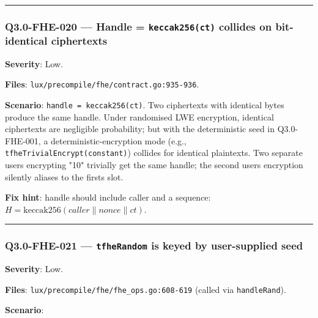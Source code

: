 \documentclass[
]{article}
\begin{document}
\begin{center}\rule{0.5\linewidth}{0.5pt}\end{center}

\subsubsection{\texorpdfstring{Q3.0-FHE-020 --- Handle =
\texttt{keccak256(ct)} collides on bit-identical
ciphertexts}{Q3.0-FHE-020 --- Handle = keccak256(ct) collides on bit-identical ciphertexts}}\label{q30-fhe-020--handle--keccak256ct-collides-on-bit-identical-ciphertexts}

\textbf{Severity}: Low.

\textbf{Files}: \texttt{lux/precompile/fhe/contract.go:935-936}.

\textbf{Scenario}: \texttt{handle\ =\ keccak256(ct)}. Two ciphertexts
with identical bytes produce the same handle. Under randomised LWE
encryption, identical ciphertexts are negligible probability; but with
the deterministic seed in Q3.0-FHE-001, a deterministic-encryption mode
(e.g., \texttt{tfheTrivialEncrypt(constant)}) collides for identical
plaintexts. Two separate users encrypting "10" trivially get the same
handle; the second user\textquotesingle s encryption silently aliases to
the first\textquotesingle s slot.

\textbf{Fix hint}: handle should include caller and a sequence:
\(H = \text{keccak256}(caller \| nonce \| ct)\).

\begin{center}\rule{0.5\linewidth}{0.5pt}\end{center}

\subsubsection{\texorpdfstring{Q3.0-FHE-021 --- \texttt{tfheRandom} is
keyed by user-supplied
seed}{Q3.0-FHE-021 --- tfheRandom is keyed by user-supplied seed}}\label{q30-fhe-021--tfherandom-is-keyed-by-user-supplied-seed}

\textbf{Severity}: Low.

\textbf{Files}: \texttt{lux/precompile/fhe/fhe\_ops.go:608-619} (called
via \texttt{handleRand}).

\textbf{Scenario}:
\end{document}
